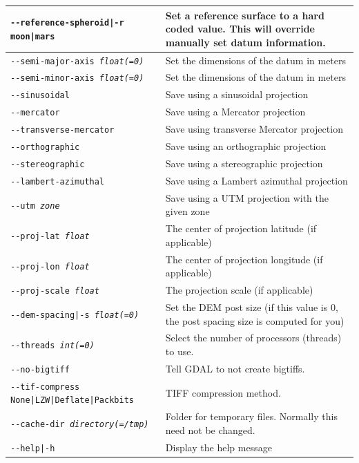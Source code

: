 \begin{longtable}{|l|p{10cm}|}
\texttt{-\/-reference-spheroid|-r moon|mars} & Set a reference surface to a hard coded value. This will override manually set datum information. \\ \hline
\texttt{-\/-semi-major-axis \textit{float(=0)}} & Set the dimensions of the datum in meters\\ \hline
\texttt{-\/-semi-minor-axis \textit{float(=0)}} & Set the dimensions of the datum in meters\\ \hline
\texttt{-\/-sinusoidal} & Save using a sinusoidal projection \\ \hline
\texttt{-\/-mercator} & Save using a Mercator projection \\ \hline
\texttt{-\/-transverse-mercator} & Save using transverse Mercator projection \\ \hline
\texttt{-\/-orthographic} & Save using an orthographic projection \\ \hline
\texttt{-\/-stereographic} & Save using a stereographic projection \\ \hline
\texttt{-\/-lambert-azimuthal} & Save using a Lambert azimuthal projection \\ \hline
\texttt{-\/-utm \textit{zone}} & Save using a UTM projection with the given zone \\ \hline
\texttt{-\/-proj-lat \textit{float}} & The center of projection latitude (if applicable) \\ \hline
\texttt{-\/-proj-lon \textit{float}} & The center of projection longitude (if applicable) \\ \hline
\texttt{-\/-proj-scale \textit{float}} & The projection scale (if applicable) \\ \hline
\texttt{-\/-dem-spacing|-s \textit{float(=0)}} & Set the \ac{DEM} post size (if this value is 0, the post spacing size is computed for you) \\ \hline
\texttt{-\/-threads \textit{int(=0)}} & Select the number of processors (threads) to use.\\ \hline
\texttt{-\/-no-bigtiff} & Tell GDAL to not create bigtiffs.\\ \hline
\texttt{-\/-tif-compress None|LZW|Deflate|Packbits} & TIFF compression method.\\ \hline
\texttt{-\/-cache-dir \textit{directory(=/tmp)}} & Folder for temporary files. Normally this need not be changed.\\ \hline
\hline
\texttt{-\/-help|-h} & Display the help message \\ \hline
\end{longtable}

